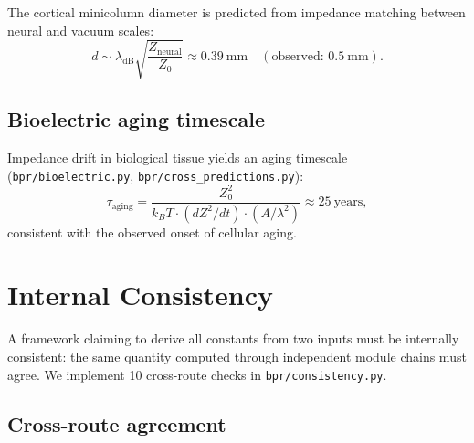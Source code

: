 \documentclass[aps,prd,twocolumn,superscriptaddress,longbibliography,nofootinbib]{revtex4-2}
\newcommand{\Zimp}{Z}
\newcommand{\Zvac}{Z_0}
\begin{document}
The cortical minicolumn diameter is predicted from impedance
matching between neural and vacuum scales:
\begin{equation}
d \sim \lambda_{\mathrm{dB}} \sqrt{\frac{\Zimp_{\mathrm{neural}}}{\Zvac}}
\approx 0.39~\text{mm}
\quad (\text{observed: } 0.5~\text{mm}).
\label{eq:cortical}
\end{equation}

\subsection{Bioelectric aging timescale}

Impedance drift in biological tissue yields an aging timescale
(\texttt{bpr/bioelectric.py}, \texttt{bpr/cross\_predictions.py}):
\begin{equation}
\tau_{\mathrm{aging}} = \frac{\Zvac^2}
  {k_B T \cdot (d\Zimp^2/dt) \cdot (A/\lambda^2)}
\approx 25~\text{years},
\label{eq:aging}
\end{equation}
consistent with the observed onset of cellular aging.


\section{Internal Consistency}
\label{sec:consistency}

A framework claiming to derive all constants from two inputs must be
internally consistent: the same quantity computed through independent
module chains must agree.  We implement 10 cross-route checks in
\texttt{bpr/consistency.py}.

\subsection{Cross-route agreement}
\end{document}
